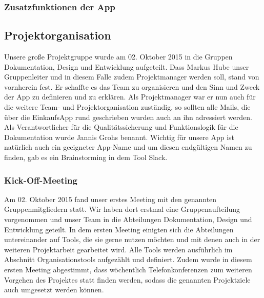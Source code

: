 \documentclass[12pt,a4paper]{article}
\begin{document}
\subsubsection{Zusatzfunktionen der App}


\newpage
\subsection{Projektorganisation}
Unsere große Projektgruppe wurde am 02. Oktober 2015 in die Gruppen Dokumentation, Design und Entwicklung aufgeteilt.
Dass Markus Hube unser Gruppenleiter und in diesem Falle zudem Projektmanager werden soll, stand von vornherein fest.
Er schaffte es das Team zu organisieren und den Sinn und Zweck der App zu definieren und zu erklären. Als Projektmanager war er nun auch für die weitere Team- und Projektorganisation zuständig, so sollten alle Mails, die über die EinkaufsApp rund geschrieben wurden auch an ihn adressiert werden.
Als Verantwortlicher für die Qualitätssicherung und Funktionslogik für die Dokumentation wurde Jannis Grohs benannt.
Wichtig für unsere App ist natürlich auch ein geeigneter App-Name und um diesen endgültigen Namen zu finden, gab es ein Brainstorming in dem Tool Slack.

\subsubsection{Kick-Off-Meeting}
Am 02. Oktober  2015 fand unser erstes Meeting mit den genannten Gruppenmitgliedern statt. 
Wir haben dort erstmal eine Gruppenaufteilung vorgenommen und unser Team in die Abteilungen Dokumentation, Design und Entwicklung geteilt. 
In dem ersten Meeting einigten sich die Abteilungen untereinander auf Tools, die sie gerne nutzen möchten und mit denen auch in der weiteren Projektarbeit gearbeitet wird. Alle Tools werden ausführlich im Abschnitt Organisationstools aufgezählt und definiert.
Zudem wurde in diesem ersten Meeting abgestimmt, dass wöchentlich Telefonkonferenzen zum weiteren Vorgehen des Projektes statt finden werden, sodass die genannten Projektziele auch umgesetzt werden können. 
\newpage
\end{document}
